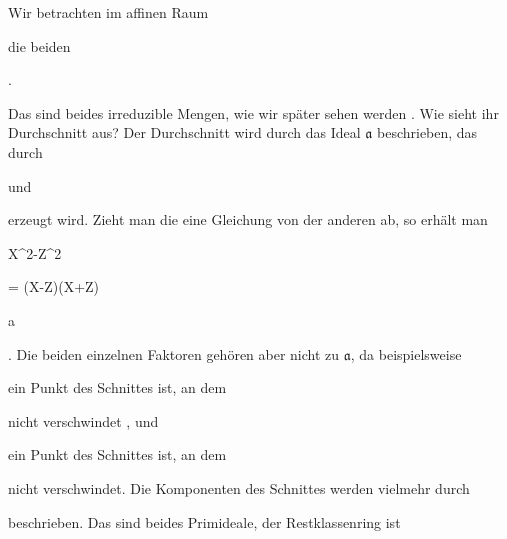 {


Wir betrachten im affinen Raum


 {} {}
die beiden  {}


 { . }


Das sind beides irreduzible Mengen, wie wir später sehen werden
 {} {.}
Wie sieht ihr Durchschnitt aus? Der Durchschnitt wird durch das Ideal ${\mathfrak a}$ beschrieben, das durch


 und


 erzeugt wird. Zieht man die eine Gleichung von der anderen ab, so erhält man


\mavergleichskettedisp


{\vergleichskette


{ X^2-Z^2
}


{ =} { (X-Z)(X+Z)
}


{ \in} { {\mathfrak a}
}


{ } {
}


{ } {
}


}
{}{}{.}
Die beiden einzelnen Faktoren gehören aber nicht zu ${\mathfrak a}$, da beispielsweise


 ein Punkt des Schnittes ist, an dem


 nicht verschwindet
 {} {,}
und


 ein Punkt des Schnittes ist, an dem


 nicht verschwindet. Die Komponenten des Schnittes werden vielmehr durch


 {  }


beschrieben. Das sind beides Primideale, der Restklassenring ist


\mavergleichskettedisp


}
